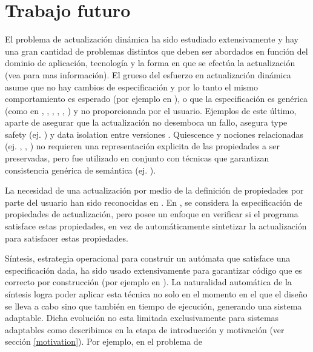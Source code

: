 \section{Trabajo futuro}

El problema de actualización dinámica ha sido estudiado extensivamente y hay una gran cantidad de problemas distintos
que deben ser abordados en función del dominio de aplicación, tecnología y la forma en que se efectúa la actualización
(vea \cite{SMR:SMR1556} para mas información). El grueso del esfuerzo en actualización dinámica asume que no hay cambios
de especificación y por lo tanto el mismo comportamiento es esperado (por ejemplo en \cite{mx:icse13}), o que la
especificación es genérica (como en \cite{Shen:2005:TUF:1095430.1081720}, \cite{5551162}, \cite{1167829},
\cite{4221625}, \cite{485222}, \cite{60317}) y no proporcionada por el usuario. Ejemplos de este último, aparte de
asegurar que la actualización no desemboca un fallo, asegura type safety (ej. \cite{Subramanian08dynamicsoftware}) y
data isolation entre versiones \cite{Stoyle07mutatismutandis:}. Quiescence \cite{60317} y nociones relacionadas (ej.
\cite{4359466},  \cite{Anderson:2009:MPM:1656437.1656448}, \cite{485222}) no requieren una representación explicita de
las propiedades a ser preservadas, pero fue utilizado en conjunto con técnicas que garantizan consistencia genérica de
semántica (ej. \cite{5546542}). 

La necesidad de una actualización por medio de la definición de propiedades por parte del usuario han sido reconocidas
en \cite{Baresi:2010:DBD:1882362.1882367}. En \cite{Hayden:2012:SVC:2189314.2189336}, se considera la especificación de
propiedades de actualización, pero posee un enfoque en verificar si el programa satisface estas propiedades, en vez de
automáticamente sintetizar la actualización para satisfacer estas propiedades. 

Síntesis, estrategia operacional para construir un autómata que satisface una especificación dada, ha sido usado
extensivamente para garantizar código que es correcto por construcción (por ejemplo en
\cite{Greenyer:2013:ISC:2491411.2491445}). La naturalidad automática de la síntesis logra poder aplicar esta técnica no
solo en el momento en el que el diseño se lleva a cabo sino que también en tiempo de ejecución, generando una sistema
adaptable. Dicha evolución no esta limitada exclusivamente para sistemas adaptables como describimos en la etapa de
introducción y motivación (ver sección \ref{motivation}). Por ejemplo, en \cite{} el problema de 


